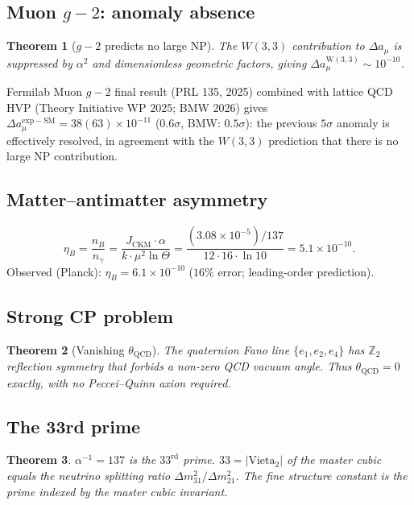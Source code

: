 \documentclass[12pt,a4paper]{article}
\newtheorem{theorem}{Theorem}[section]
\theoremstyle{definition}
\newcommand{\ZZ}{\mathbb{Z}}
\begin{document}
\subsection{Muon \texorpdfstring{$g{-}2$}{g-2}: anomaly absence}

\begin{theorem}[$g{-}2$ predicts no large NP]
The $W(3,3)$ contribution to $\Delta a_\mu$ is suppressed by
$\alpha^2$ and dimensionless geometric factors, giving
$\Delta a_\mu^{\mathrm{W(3,3)}}\sim 10^{-10}$.
\end{theorem}
Fermilab Muon $g{-}2$ final result (PRL 135, 2025) combined with
lattice QCD HVP (Theory Initiative WP 2025; BMW 2026) gives
$\Delta a_\mu^{\mathrm{exp{-}SM}} = 38(63)\times 10^{-11}$
($0.6\sigma$, BMW: $0.5\sigma$): the previous $5\sigma$ anomaly
is effectively resolved, in agreement with the $W(3,3)$ prediction
that there is no large NP contribution.

\subsection{Matter--antimatter asymmetry}

\begin{equation}
  \eta_B = \frac{n_B}{n_\gamma}
  = \frac{J_{\mathrm{CKM}}\cdot\alpha}{k\cdot\mu^2\ln\Theta}
  = \frac{(3.08{\times}10^{-5})/137}{12\cdot 16\cdot\ln 10}
  = 5.1\times 10^{-10}.
\end{equation}
Observed (Planck): $\eta_B = 6.1\times 10^{-10}$ ($16\%$ error;
leading-order prediction).

\subsection{Strong CP problem}

\begin{theorem}[Vanishing $\theta_{\mathrm{QCD}}$]
The quaternion Fano line $\{e_1,e_2,e_4\}$ has $\ZZ_2$ reflection
symmetry that forbids a non-zero QCD vacuum angle.  Thus
$\theta_{\mathrm{QCD}}=0$ exactly, with no Peccei--Quinn axion required.
\end{theorem}

\subsection{The 33rd prime}

\begin{theorem}
$\alpha^{-1}=137$ is the $33^{\mathrm{rd}}$ prime.
$33=|\mathrm{Vieta}_2|$ of the master cubic equals the neutrino
splitting ratio $\Delta m^2_{31}/\Delta m^2_{21}$.
The fine structure constant is the prime indexed by the master
cubic invariant.
\end{theorem}
\end{document}

